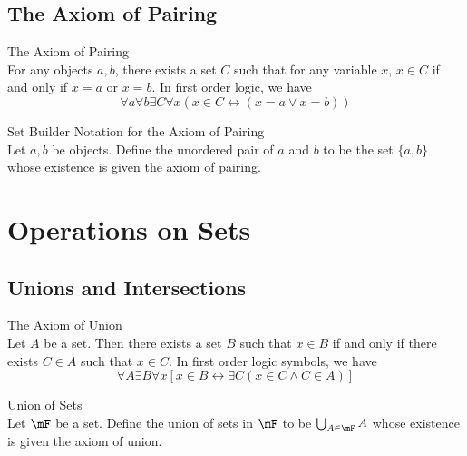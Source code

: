 \documentclass[a4paper]{article}
\begin{document}
\subsection{The Axiom of Pairing}
\begin{axm}{The Axiom of Pairing}{}\\
For any objects $a,b$, there exists a set $C$ such that for any variable $x$, $x\in C$ if and only if $x=a$ or $x=b$. In first order logic, we have $$\forall a\forall b\exists C\forall x(x\in C\leftrightarrow(x=a\vee x=b))$$
\end{axm}

\begin{defn}{Set Builder Notation for the Axiom of Pairing}{}\\
Let $a,b$ be objects. Define the unordered pair of $a$ and $b$ to be the set $\{a,b\}$ whose existence is given the axiom of pairing. 
\end{defn}

\pagebreak
\section{Operations on Sets}
\subsection{Unions and Intersections}
\begin{axm}{The Axiom of Union}{}\\
Let $A$ be a set. Then there exists a set $B$ such that $x\in B$ if and only if there exists $C\in A$ such that $x\in C$. In first order logic symbols, we have $$\forall A\exists B\forall x\left[x\in B\leftrightarrow\exists C(x\in C\wedge C\in A)\right]$$
\end{axm}

\begin{defn}{Union of Sets}{}\\
Let $\mF$ be a set. Define the union of sets in $\mF$ to be $\bigcup_{A\in\mF}A$ whose existence is given the axiom of union. 
\end{defn}
\end{document}

